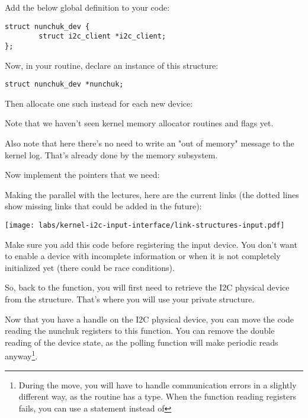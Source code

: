Add the below global definition to your code:

\begin{verbatim}
struct nunchuk_dev {
        struct i2c_client *i2c_client;
};
\end{verbatim}

Now, in your  routine, declare an instance of
this structure:

\begin{verbatim}
struct nunchuk_dev *nunchuk;
\end{verbatim}

Then allocate one such instead for each new device:


Note that we haven't seen kernel memory allocator routines and flags
yet.

Also note that here there's no need to write an "out of memory"
message to the kernel log. That's already done by the memory subsystem.

Now implement the pointers that we need:


Making the parallel with the lectures, here are the current links (the
dotted lines show missing links that could be added in the future):
\begin{center}
\texttt{[image: labs/kernel-i2c-input-interface/link-structures-input.pdf]}
\end{center}

Make sure you add this code before registering the input device. You
don't want to enable a device with incomplete information or when it is
not completely initialized yet (there could be race conditions).

So, back to the  function, you will first need to
retrieve the I2C physical device from the 
structure. That's where you will use your private 
structure.

Now that you have a handle on the I2C physical device, you can move the
code reading the nunchuk registers to this function. You can
remove the double reading of the device state, as the polling function
will make periodic reads anyway\footnote{During the move, you will have
to handle communication errors in a slightly different way, as the
 routine has a  type. When the function
reading registers fails, you can use a  statement instead
of }.

